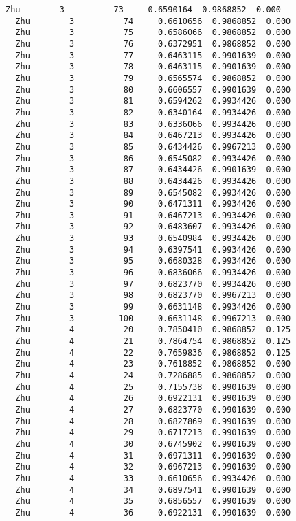 \documentclass[11pt]{article}
\begin{document}
\begin{Verbatim}[commandchars=\\\{\}]
  Zhu        3          73     0.6590164  0.9868852  0.000
  Zhu        3          74     0.6610656  0.9868852  0.000
  Zhu        3          75     0.6586066  0.9868852  0.000
  Zhu        3          76     0.6372951  0.9868852  0.000
  Zhu        3          77     0.6463115  0.9901639  0.000
  Zhu        3          78     0.6463115  0.9901639  0.000
  Zhu        3          79     0.6565574  0.9868852  0.000
  Zhu        3          80     0.6606557  0.9901639  0.000
  Zhu        3          81     0.6594262  0.9934426  0.000
  Zhu        3          82     0.6340164  0.9934426  0.000
  Zhu        3          83     0.6336066  0.9934426  0.000
  Zhu        3          84     0.6467213  0.9934426  0.000
  Zhu        3          85     0.6434426  0.9967213  0.000
  Zhu        3          86     0.6545082  0.9934426  0.000
  Zhu        3          87     0.6434426  0.9901639  0.000
  Zhu        3          88     0.6434426  0.9934426  0.000
  Zhu        3          89     0.6545082  0.9934426  0.000
  Zhu        3          90     0.6471311  0.9934426  0.000
  Zhu        3          91     0.6467213  0.9934426  0.000
  Zhu        3          92     0.6483607  0.9934426  0.000
  Zhu        3          93     0.6540984  0.9934426  0.000
  Zhu        3          94     0.6397541  0.9934426  0.000
  Zhu        3          95     0.6680328  0.9934426  0.000
  Zhu        3          96     0.6836066  0.9934426  0.000
  Zhu        3          97     0.6823770  0.9934426  0.000
  Zhu        3          98     0.6823770  0.9967213  0.000
  Zhu        3          99     0.6631148  0.9934426  0.000
  Zhu        3         100     0.6631148  0.9967213  0.000
  Zhu        4          20     0.7850410  0.9868852  0.125
  Zhu        4          21     0.7864754  0.9868852  0.125
  Zhu        4          22     0.7659836  0.9868852  0.125
  Zhu        4          23     0.7618852  0.9868852  0.000
  Zhu        4          24     0.7286885  0.9868852  0.000
  Zhu        4          25     0.7155738  0.9901639  0.000
  Zhu        4          26     0.6922131  0.9901639  0.000
  Zhu        4          27     0.6823770  0.9901639  0.000
  Zhu        4          28     0.6827869  0.9901639  0.000
  Zhu        4          29     0.6717213  0.9901639  0.000
  Zhu        4          30     0.6745902  0.9901639  0.000
  Zhu        4          31     0.6971311  0.9901639  0.000
  Zhu        4          32     0.6967213  0.9901639  0.000
  Zhu        4          33     0.6610656  0.9934426  0.000
  Zhu        4          34     0.6897541  0.9901639  0.000
  Zhu        4          35     0.6856557  0.9901639  0.000
  Zhu        4          36     0.6922131  0.9901639  0.000

\end{Verbatim}
\end{document}
